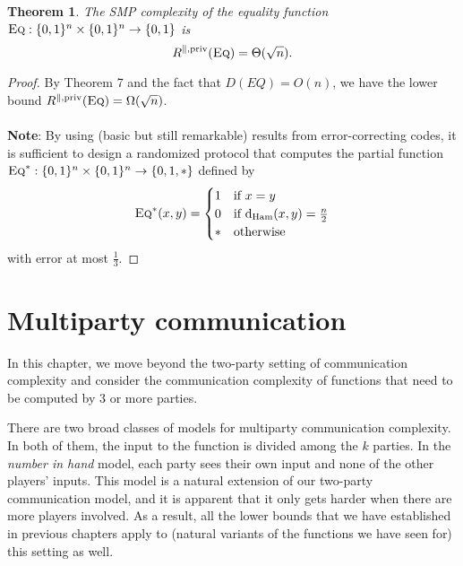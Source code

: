 \documentclass[11pt,oneside]{book}
\theoremstyle{plain}
\newtheorem{theorem}{Theorem}
\theoremstyle{definition}
\theoremstyle{plain}
\newcommand{\dHam}{\mathrm{d}_{\mathrm{Ham}}}
\newcommand{\Eq}{\textsc{Eq}}
\begin{document}
\begin{theorem}
	The SMP complexity of the equality function $\Eq : \{0,1\}^n \times \{0,1\}^n \to \{0,1\}$ is
	\[
	R^{\parallel,\mathrm{priv}}(\Eq) = \Theta(\sqrt{n}).
	\]
\end{theorem}

\begin{proof}
By Theorem 7 and the fact that $D(EQ) = O(n)$, we have the lower bound $R^{\parallel,\mathrm{priv}}(\Eq) = \Omega(\sqrt{n})$.\\
	 \\
\textbf{Note}: By using (basic but still remarkable) results from error-correcting codes, it is sufficient to design a randomized protocol that computes the partial function $\Eq^* : \{0,1\}^n \times \{0,1\}^n \to \{0,1,*\}$ defined by
\[
\Eq^*(x,y) = \begin{cases}
1 & \mbox{if } x = y \\
0 & \mbox{if } \dHam(x,y) = \frac n2 \\
* & \mbox{otherwise}
\end{cases}
\]
with error at most $\frac13$.

\end{proof}
	


\chapter[CH07]{Multiparty communication}

	
	In this chapter, we move beyond the two-party setting of communication complexity and consider the communication complexity of functions that need to be computed by 3 or more parties.
	
	There are two broad classes of models for multiparty communication complexity. In both of them, the input to the function is divided among the $k$ parties. In the \emph{number in hand} model, each party sees their own input and none of the other players' inputs. This model is a natural extension of our two-party communication model, and it is apparent that it only gets harder when there are more players involved. As a result, all the lower bounds that we have established in previous chapters apply to (natural variants of the functions we have seen for) this setting as well.
	
\end{document}
